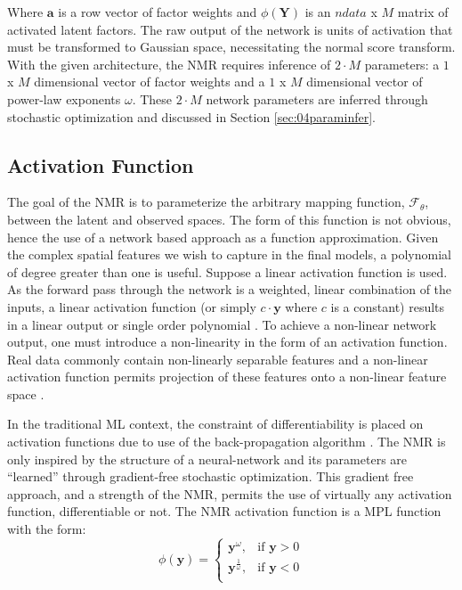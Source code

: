 Where $\mathbf{a}$ is a row vector of factor weights and $\phi\left(\mathbf{Y} \right)$ is an $ndata$ x $M$ matrix of activated latent factors. The raw output of the network is units of activation that must be transformed to Gaussian space, necessitating the normal score transform. With the given architecture, the \gls{NMR} requires inference of $2 \cdot M$ parameters: a $1$ x $M$ dimensional vector of factor weights and a $1$ x $M$ dimensional vector of power-law exponents $\omega$. These $2 \cdot M$ network parameters are inferred through stochastic optimization and discussed in Section \ref{sec:04paraminfer}.

\subsection{Activation Function}
\label{subsec:04activation}

The goal of the \gls{NMR} is to parameterize the arbitrary mapping function, $\mathcal{F}_{\theta}$, between the latent and observed spaces. The form of this function is not obvious, hence the use of a network based approach as a function approximation. Given the complex spatial features we wish to capture in the final models, a polynomial of degree greater than one is useful. Suppose a linear activation function is used. As the forward pass through the network is a weighted, linear combination of the inputs, a linear activation function (or simply $c \cdot \mathbf{y}$ where $c$ is a constant) results in a linear output or single order polynomial \citep{sharma2020activation}. To achieve a non-linear network output, one must introduce a non-linearity in the form of an activation function. Real data commonly contain non-linearly separable features and a non-linear activation function permits projection of these features onto a non-linear feature space \citep{dubey2022activation}.

In the traditional \gls{ML} context, the constraint of differentiability is placed on activation functions due to use of the back-propagation algorithm \citep{rojas1996backpropagation}. The \gls{NMR} is only inspired by the structure of a neural-network and its parameters are ``learned'' through gradient-free stochastic optimization. This gradient free approach, and a strength of the \gls{NMR}, permits the use of virtually any activation function, differentiable or not. The \gls{NMR} activation function is a \gls{MPL} function with the form:
\begin{equation}
    \phi \left( \mathbf{y} \right) =
    \begin{cases}
        \mathbf{y}^{\omega},           & \text{if $\mathbf{y} > 0$} \\
        \mathbf{y}^{\frac{1}{\omega}}, & \text{if $\mathbf{y} < 0$} \\
    \end{cases}
    \label{eq:power}
\end{equation}

